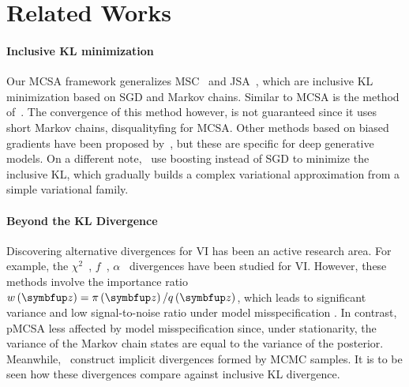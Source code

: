 \vspace{-0.05in}
\section{Related Works}\label{section:related}
\vspace{-0.05in}
\paragraph{Inclusive KL minimization}
Our MCSA framework generalizes MSC~\citep{NEURIPS2020_b2070693} and JSA~\citet{pmlr-v124-ou20a}, which are inclusive KL minimization based on SGD and Markov chains.
Similar to MCSA is the method of~\citet{li_approximate_2017}.
The convergence of this method however, is not guaranteed since it uses short Markov chains, disqualityfing for MCSA.
Other methods based on biased gradients have been proposed by~\citet{DBLP:journals/corr/BornscheinB14,le_revisiting_2019}, but these are specific for deep generative models.
On a different note,~\citet{pmlr-v161-jerfel21a} use boosting instead of SGD to minimize the inclusive KL, which gradually builds a complex variational approximation from a simple variational family.

\vspace{-0.1in}
\paragraph{Beyond the KL Divergence}
Discovering alternative divergences for VI has been an active research area.
For example, the \(\chi^2\)~\citep{NIPS2017_35464c84}, \(f\)~\citep{NEURIPS2018_1cd138d0, NEURIPS2020_c928d86f}, \(\alpha\)~\citet{NIPS2016_7750ca35, regli_alphabeta_2018, pmlr-v48-hernandez-lobatob16} divergences have been studied for VI.
However, these methods involve the importance ratio \(w\left(\vz\right) = \pi\left(\vz\right)/q\left(\vz\right)\), which leads to significant variance and low signal-to-noise ratio under model misspecification \citep{geffner2021empirical, pmlr-v139-geffner21a}.
In contrast, pMCSA less affected by model misspecification since, under stationarity, the variance of the Markov chain states are equal to the variance of the posterior.
Meanwhile,~\citet{pmlr-v37-salimans15,pmlr-v97-ruiz19a,NEURIPS2021_05f971b5,NEURIPS2021_a1a609f1} construct implicit divergences formed by MCMC samples.
It is to be seen how these divergences compare against inclusive KL divergence.

\vspace{-0.1in}
